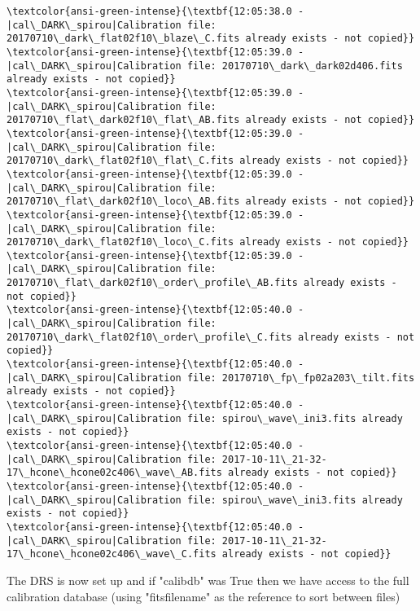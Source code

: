 \documentclass[11pt]{article}
\begin{document}
\begin{Verbatim}[commandchars=\\\{\}]
\textcolor{ansi-green-intense}{\textbf{12:05:38.0 -   |cal\_DARK\_spirou|Calibration file: 20170710\_dark\_flat02f10\_blaze\_C.fits already exists - not copied}}
\textcolor{ansi-green-intense}{\textbf{12:05:39.0 -   |cal\_DARK\_spirou|Calibration file: 20170710\_dark\_dark02d406.fits already exists - not copied}}
\textcolor{ansi-green-intense}{\textbf{12:05:39.0 -   |cal\_DARK\_spirou|Calibration file: 20170710\_flat\_dark02f10\_flat\_AB.fits already exists - not copied}}
\textcolor{ansi-green-intense}{\textbf{12:05:39.0 -   |cal\_DARK\_spirou|Calibration file: 20170710\_dark\_flat02f10\_flat\_C.fits already exists - not copied}}
\textcolor{ansi-green-intense}{\textbf{12:05:39.0 -   |cal\_DARK\_spirou|Calibration file: 20170710\_flat\_dark02f10\_loco\_AB.fits already exists - not copied}}
\textcolor{ansi-green-intense}{\textbf{12:05:39.0 -   |cal\_DARK\_spirou|Calibration file: 20170710\_dark\_flat02f10\_loco\_C.fits already exists - not copied}}
\textcolor{ansi-green-intense}{\textbf{12:05:39.0 -   |cal\_DARK\_spirou|Calibration file: 20170710\_flat\_dark02f10\_order\_profile\_AB.fits already exists - not copied}}
\textcolor{ansi-green-intense}{\textbf{12:05:40.0 -   |cal\_DARK\_spirou|Calibration file: 20170710\_dark\_flat02f10\_order\_profile\_C.fits already exists - not copied}}
\textcolor{ansi-green-intense}{\textbf{12:05:40.0 -   |cal\_DARK\_spirou|Calibration file: 20170710\_fp\_fp02a203\_tilt.fits already exists - not copied}}
\textcolor{ansi-green-intense}{\textbf{12:05:40.0 -   |cal\_DARK\_spirou|Calibration file: spirou\_wave\_ini3.fits already exists - not copied}}
\textcolor{ansi-green-intense}{\textbf{12:05:40.0 -   |cal\_DARK\_spirou|Calibration file: 2017-10-11\_21-32-17\_hcone\_hcone02c406\_wave\_AB.fits already exists - not copied}}
\textcolor{ansi-green-intense}{\textbf{12:05:40.0 -   |cal\_DARK\_spirou|Calibration file: spirou\_wave\_ini3.fits already exists - not copied}}
\textcolor{ansi-green-intense}{\textbf{12:05:40.0 -   |cal\_DARK\_spirou|Calibration file: 2017-10-11\_21-32-17\_hcone\_hcone02c406\_wave\_C.fits already exists - not copied}}

    \end{Verbatim}

    The DRS is now set up and if "calibdb" was True then we have access to
the full calibration database (using "fitsfilename" as the reference to
sort between files)
\end{document}
